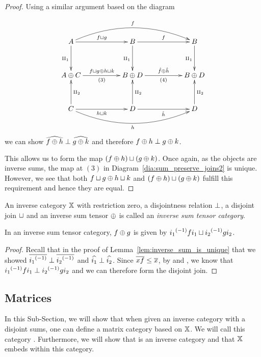 \begin{proof}
  Using a similar argument based on the diagram

  \begin{equation}
    \xymatrix@R+10pt@C+28pt {
      A \ar[r]^{f\djoin g} \ar[d]_{\cpa} \ar@/^20pt/[rr]^f
        & B \ar[r]^{f} \ar[d]_{\cpa}  & B \ar[d]_{\cpa}\\
      A\+C  \ar[r]^{f\djoin g \+ h\djoin k}_{(3)}
        & B\+D \ar[r]^{\rg{f}\+\rg{h}}_{(4)}   & B \+D \\
      C  \ar[r]_{h\djoin k} \ar[u]_{\cpb} \ar@/_20pt/[rr]_h
        & D\ar[r]_{\rg{h}} \ar[u]_{\cpb}  & D \ar[u]_{\cpb}
    }\label{dia:sum_preserve_joins2}
  \end{equation}
  we can show $\widehat{f\oplus h} \perp \widehat{g\oplus k}$ and therefore $f\oplus h \perp g\oplus k$.

  This allows us to form the map $(f\oplus h) \sqcup (g\oplus k)$. Once again, as the objects are inverse
  sums, the map at $(3)$ in Diagram~\ref{dia:sum_preserve_joins2} is unique.
  However, we see that both $f\sqcup g \oplus h\sqcup k$ and $(f\oplus h) \sqcup (g\oplus k)$ fulfill this
  requirement and hence they are equal.
\end{proof}


\begin{definition}\label{def:inverse_sum_tensor_category}
  An inverse category $\mathbb{X}$ with restriction zero, a disjointness relation $\perp$, a disjoint
  join $\sqcup$ and an inverse sum tensor $\oplus$ is called an \emph{inverse sum tensor category}.
\end{definition}

\begin{corollary}\label{cor:inverse_sum_of_maps_is_disjoint_join}
  In an inverse sum tensor category, $f \oplus g$ is given by ${i_1}^{(-1)} f i_1 \sqcup {i_2}^{(-1)} g i_2$.
\end{corollary}
\begin{proof}
  Recall that in the proof of Lemma~\ref{lem:inverse_sum_is_unique} that we showed $\overline{{i_1}^{(-1)}}
  \perp \overline{{i_2}^{(-1)}}$ and $\widehat{i_1}\perp \widehat{i_2}$. Since $\overline{x f} \le \overline{x}$, by
   and , we know that ${i_1}^{(-1)} f i_1 \perp {i_2}^{(-1)} g i_2$ and we
  can therefore form the disjoint join.
\end{proof}


\subsection{Matrices} %
\label{sub:matrix_representation}
In this Sub-Section, we will show that when given an inverse  category \X with a disjoint sums, one
can define a matrix category based on $\mathbb{X}$. We will call this category \imatx. Furthermore, we will
show that \imatx is an inverse category and that $\mathbb{X}$ embeds within this category.

